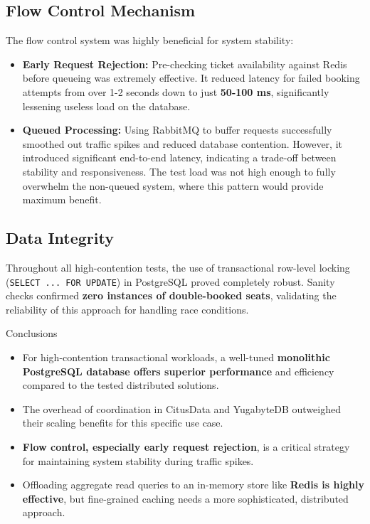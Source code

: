 \documentclass[a0,landscape]{config/poster/a0poster}
\newcommand{\postersection}[1]{%
  \begin{tcolorbox}[
      colback=IEEEblue,
      colframe=IEEEblue,
      fonttitle=\bfseries,
      coltext=white,
      sharp corners,
      boxrule=0pt,
      top=4pt,
      bottom=4pt,
      halign=center
    ]
    \large #1
  \end{tcolorbox}%
}
\begin{document}
\begin{multicols}{4}
	\subsection*{Flow Control Mechanism}
	The flow control system was highly beneficial for system stability:
	\begin{itemize}
		\item \textbf{Early Request Rejection:} Pre-checking ticket availability against Redis before queueing was extremely effective. It reduced latency for failed booking attempts from over 1-2 seconds down to just \textbf{50-100 ms}, significantly lessening useless load on the database.
		\item \textbf{Queued Processing:} Using RabbitMQ to buffer requests successfully smoothed out traffic spikes and reduced database contention. However, it introduced significant end-to-end latency, indicating a trade-off between stability and responsiveness. The test load was not high enough to fully overwhelm the non-queued system, where this pattern would provide maximum benefit.
	\end{itemize}

	\subsection*{Data Integrity}
	Throughout all high-contention tests, the use of transactional row-level locking (\texttt{SELECT ... FOR UPDATE}) in PostgreSQL proved completely robust. Sanity checks confirmed \textbf{zero instances of double-booked seats}, validating the reliability of this approach for handling race conditions.


	\columnbreak

	\postersection{Conclusions}
	\begin{itemize}
		\item For high-contention transactional workloads, a well-tuned \textbf{monolithic PostgreSQL database offers superior performance} and efficiency compared to the tested distributed solutions.
		\item The overhead of coordination in CitusData and YugabyteDB outweighed their scaling benefits for this specific use case.
		\item \textbf{Flow control, especially early request rejection}, is a critical strategy for maintaining system stability during traffic spikes.
		\item Offloading aggregate read queries to an in-memory store like \textbf{Redis is highly effective}, but fine-grained caching needs a more sophisticated, distributed approach.
	\end{itemize}


\end{multicols}
\end{document}
